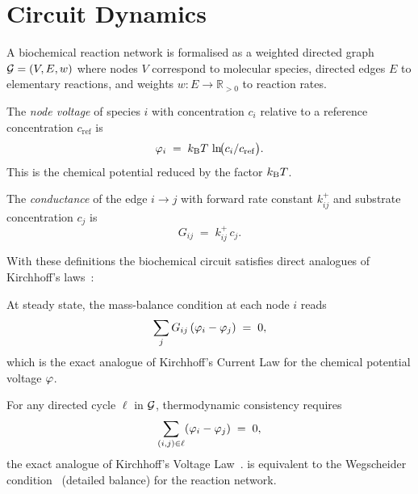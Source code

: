 \section{Circuit Dynamics}
\label{sec:circuit-dynamics}

A biochemical reaction network is formalised as a weighted directed graph
$\mathcal{G} = (V, E, w)$ where nodes $V$ correspond to molecular species, directed
edges $E$ to elementary reactions, and weights $w:E\to\mathbb{R}_{>0}$ to
reaction rates.

\begin{definition}
\label{def:node-voltage}
The \emph{node voltage} of species $i$ with concentration $c_i$ relative to a
reference concentration $c_\mathrm{ref}$ is
\[
    \varphi_i
    \;=\;
    k_{\mathrm{B}} T\,\ln\!\bigl(c_i/c_\mathrm{ref}\bigr).
\]
This is the chemical potential reduced by the factor $k_{\mathrm{B}} T$.
\end{definition}

\begin{definition}
\label{def:edge-cond}
The \emph{conductance} of the edge $i\to j$ with forward rate constant $k_{ij}^+$
and substrate concentration $c_j$ is
\[
    G_{ij} \;=\; k_{ij}^+\,c_j.
\]
\end{definition}

With these definitions the biochemical circuit satisfies direct analogues of
Kirchhoff's laws~\citep{Kirchhoff1847}:

\begin{theorem}
\label{thm:kcl}
At steady state, the mass-balance condition at each node $i$ reads
\begin{equation}
    \sum_j G_{ij}\,(\varphi_i - \varphi_j) \;=\; 0,
    \label{eq:kcl}
\end{equation}
which is the exact analogue of Kirchhoff's Current Law for the chemical
potential voltage $\varphi$.
\end{theorem}

\begin{theorem}
\label{thm:kvl}
For any directed cycle $\ell$ in $\mathcal{G}$, thermodynamic consistency requires
\begin{equation}
    \sum_{(i,j)\in\ell}(\varphi_i - \varphi_j) \;=\; 0,
    \label{eq:kvl}
\end{equation}
the exact analogue of Kirchhoff's Voltage Law~\citep{Kirchhoff1847}.   is equivalent to
the Wegscheider condition~\citep{Wegscheider1901} (detailed balance) for the reaction network.
\end{theorem}

